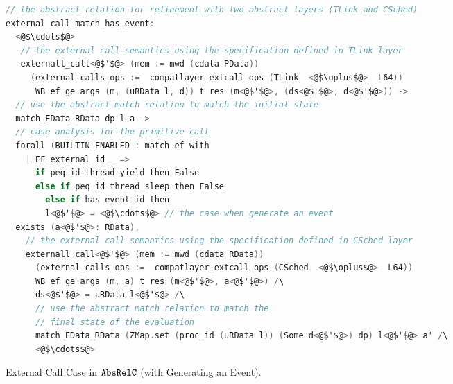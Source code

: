 \begin{figure}
\begin{lstlisting}[language=C]     
// the abstract relation for refinement with two abstract layers (TLink and CSched)
external_call_match_has_event:
  <@$\cdots$@>
   // the external call semantics using the specification defined in TLink layer
   externall_call<@$'$@> (mem := mwd (cdata PData)) 
     (external_calls_ops :=  compatlayer_extcall_ops (TLink  <@$\oplus$@>  L64))
      WB ef ge args (m, (uRData l, d)) t res (m<@$'$@>, (ds<@$'$@>, d<@$'$@>)) ->
  // use the abstract match relation to match the initial state
  match_EData_RData dp l a ->
  // case analysis for the primitive call
  forall (BUILTIN_ENABLED : match ef with
    | EF_external id _ => 
      if peq id thread_yield then False
      else if peq id thread_sleep then False
        else if has_event id then
        l<@$'$@> = <@$\cdots$@> // the case when generate an event   
  exists (a<@$'$@>: RData),
    // the external call semantics using the specification defined in CSched layer  
    externall_call<@$'$@> (mem := mwd (cdata RData)) 
      (external_calls_ops :=  compatlayer_extcall_ops (CSched  <@$\oplus$@>  L64))
      WB ef ge args (m, a) t res (m<@$'$@>, a<@$'$@>) /\
      ds<@$'$@> = uRData l<@$'$@> /\
      // use the abstract match relation to match the 
      // final state of the evaluation
      match_EData_RData (ZMap.set (proc_id (uRData l)) (Some d<@$'$@>) dp) l<@$'$@> a' /\
      <@$\cdots$@>
\end{lstlisting}
\caption{External Call Case in ${\mathrm{\texttt{AbsRelC}}}$ (with Generating an Event).}
\label{fig:chapter:conlink:two-cases-of-abs-rel-c}
\end{figure}

